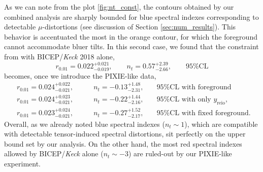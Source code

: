  As we can note from the plot \ref{fig:nt_const}, the contours obtained by our combined analysis are sharply bounded for blue spectral indexes corresponding to detectable $\mu$-distortions (see discussion of Section \ref{sec:num_results}). This behavior is accentuated the most in the orange contour, for which the foreground cannot accommodate bluer tilts.   In this second case, we found that the constraint from with BICEP/\emph{Keck} 2018 alone,
$$r_{0.01}=0.022^{+0.021}_{-0.019} ,\qquad n_t=0.57^{+2.39}_{-2.66},\qquad \text{95\%CL}$$
becomes, once we introduce the PIXIE-like data,
\begin{align*}
    &r_{0.01}=0.024^{+0.022}_{-0.021} ,\qquad &n_t=-0.13^{+1.48}_{-2.31},\quad &\text{95\%CL with foreground }\\
    &r_{0.01}=0.024^{+0.023}_{-0.021} ,\qquad &n_t=-0.22^{+1.44}_{-2.16},\quad &\text{95\%CL with only }y_\text{reio},\\
    &r_{0.01}=0.023^{+0.024}_{-0.021} ,\qquad &n_t=-0.27^{+1.52}_{-2.17},\quad &\text{95\%CL with fixed foreground. }
\end{align*}
 Overall, as we already noted blue spectral indexes ($n_t\sim1$), which are compatible with detectable tensor-induced spectral distortions, sit perfectly on the upper bound set by our analysis. On the other hand, the most red spectral indexes allowed by BICEP/\emph{Keck} alone ($n_t\sim-3$) are ruled-out by our PIXIE-like experiment.
